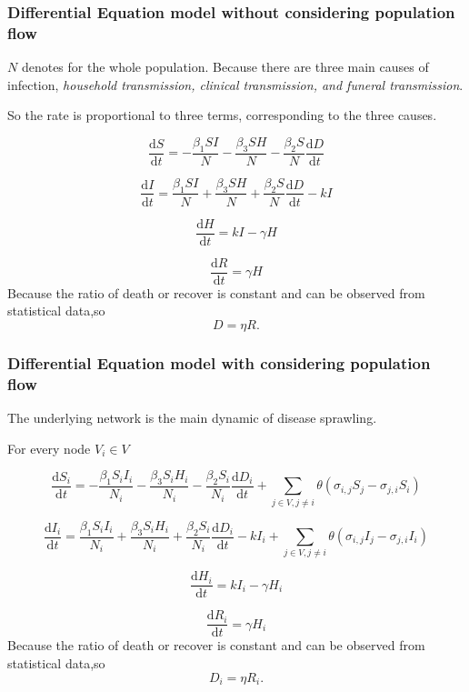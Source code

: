 \documentclass[11pt]{article}
\begin{document}
\subsubsection{Differential Equation model without considering population flow}

$N$ denotes for the whole population. Because there are three main causes of infection, \emph{household transmission, clinical transmission, and funeral transmission}.

So the rate is proportional to three terms, corresponding to the three causes.

$$\frac{\mathrm{d}S}{\mathrm{d}t} = -\frac{\beta_1 S I}{N}-\frac{\beta_3 S H}{N}  - \frac{\beta_2 S }{N} \frac{\mathrm{d}D}{\mathrm{d}t} $$ 


$$\frac{\mathrm{d}I}{\mathrm{d}t} = \frac{\beta_1 S I}{N} +\frac{\beta_3 S H}{N}  + \frac{\beta_2 S }{N} \frac{\mathrm{d}D}{\mathrm{d}t} - kI$$ 

$$\frac{\mathrm{d}H}{\mathrm{d}t} = kI - \gamma H$$

$$\frac{\mathrm{d}R}{\mathrm{d}t} = \gamma H$$
Because the ratio of death or recover is constant and can be observed from statistical data,so 
$$D =\eta R. $$

\subsubsection{Differential Equation model with considering population flow}

The underlying network is the main dynamic of disease sprawling. 

For every node $V_i \in V$

$$\frac{\mathrm{d}S_i}{\mathrm{d}t} = -\frac{\beta_1 S_i I_i}{N_i}-\frac{\beta_3 S_i H_i}{N_i}  - \frac{\beta_2 S_i }{N_i} \frac{\mathrm{d}D_i}{\mathrm{d}t} + \sum_{j\in V,j\neq i} \theta(\sigma_{i,j} S_j - \sigma_{j,i} S_i) $$ 


$$\frac{\mathrm{d}I_i}{\mathrm{d}t} = \frac{\beta_1 S_i I_i}{N_i} +\frac{\beta_3 S_i H_i}{N_i}  + \frac{\beta_2 S_i }{N_i} \frac{\mathrm{d}D_i}{\mathrm{d}t} - kI_i + \sum_{j\in V,j\neq i} \theta(\sigma_{i,j} I_j - \sigma_{j,i} I_i)$$ 

$$\frac{\mathrm{d}H_i}{\mathrm{d}t} = kI_i - \gamma H_i$$

$$\frac{\mathrm{d}R_i}{\mathrm{d}t} = \gamma H_i$$
Because the ratio of death or recover is constant and can be observed from statistical data,so 
$$D_i =\eta R_i. $$
\end{document}
